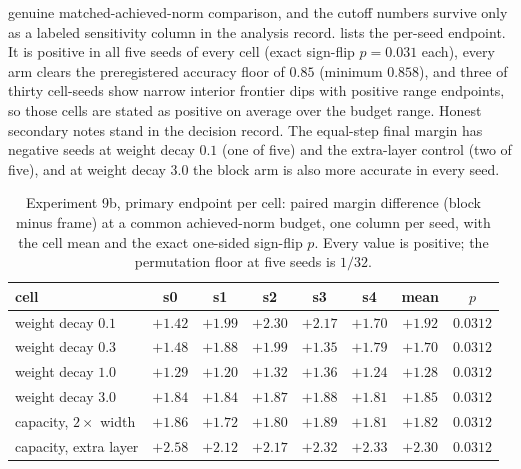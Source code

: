 \documentclass{article}
\begin{document}
genuine matched-achieved-norm comparison, and the cutoff numbers survive
only as a labeled sensitivity column in the analysis record.
 lists the per-seed endpoint. It is positive in all
five seeds of every cell (exact sign-flip $p = 0.031$ each), every arm
clears the preregistered accuracy floor of $0.85$ (minimum $0.858$), and
three of thirty cell-seeds show narrow interior frontier dips with
positive range endpoints, so those cells are stated as positive on
average over the budget range. Honest secondary notes stand in the
decision record. The equal-step final margin has negative seeds at
weight decay $0.1$ (one of five) and the extra-layer control (two of
five), and at weight decay $3.0$ the block arm is also more accurate in
every seed.

\begin{table}[t]
\centering
\caption{Experiment 9b, primary endpoint per cell: paired margin
difference (block minus frame) at a common achieved-norm budget, one
column per seed, with the cell mean and the exact one-sided sign-flip
$p$. Every value is positive; the permutation floor at five seeds is
$1/32$.}
\label{tab:p1bcells}
\scriptsize
\begin{tabular}{lccccccc}
\toprule
cell & s0 & s1 & s2 & s3 & s4 & mean & $p$ \\
\midrule
weight decay $0.1$ & $+1.42$ & $+1.99$ & $+2.30$ & $+2.17$ & $+1.70$ & $+1.92$ & $0.0312$ \\
weight decay $0.3$ & $+1.48$ & $+1.88$ & $+1.99$ & $+1.35$ & $+1.79$ & $+1.70$ & $0.0312$ \\
weight decay $1.0$ & $+1.29$ & $+1.20$ & $+1.32$ & $+1.36$ & $+1.24$ & $+1.28$ & $0.0312$ \\
weight decay $3.0$ & $+1.84$ & $+1.84$ & $+1.87$ & $+1.88$ & $+1.81$ & $+1.85$ & $0.0312$ \\
capacity, $2\times$ width & $+1.86$ & $+1.72$ & $+1.80$ & $+1.89$ & $+1.81$ & $+1.82$ & $0.0312$ \\
capacity, extra layer & $+2.58$ & $+2.12$ & $+2.17$ & $+2.32$ & $+2.33$ & $+2.30$ & $0.0312$ \\
\bottomrule
\end{tabular}
\end{table}
\end{document}
